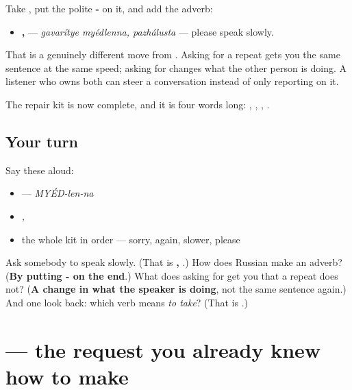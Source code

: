 \begin{grammarlens}[title={Grammar lens — the second repair move}]
Take \textbf{}, put the polite \textbf{-} on it, and add the adverb:

\begin{itemize}
\raggedright
  \item \textbf{ , } — \emph{gavarítye myédlenna, pazhálusta} — please speak slowly.
\end{itemize}

That is a genuinely different move from \textbf{}. Asking for a repeat gets you the same sentence at the same speed; asking for \textbf{} changes what the other person is doing. A listener who owns both can steer a conversation instead of only reporting on it.

The repair kit is now complete, and it is four words long: \textbf{}, \textbf{}, \textbf{ }, \textbf{}.
\end{grammarlens}

\subsection*{Your turn}
Say these aloud:

\begin{itemize}
\raggedright
  \item \emph{} — \emph{MYÉD-len-na}
  \item \emph{ , }
  \item the whole kit in order — sorry, again, slower, please
\end{itemize}

\begin{tcolorbox}[breakable,colback=teal!4,colframe=teal!35!black,title={Before you move on}]
Ask somebody to speak slowly. (That is \textbf{ , }.) How does Russian make an adverb? (\textbf{By putting - on the end}.) What does asking for \textbf{} get you that a repeat does not? (\textbf{A change in what the speaker is doing}, not the same sentence again.) And one look back: which verb means \emph{to take}? (That is \textbf{}.)
\end{tcolorbox}
\section[\texorpdfstring{\ru{помогите} (pamagítye)}{помогите (pamagítye)}]{ — the request you already knew how to make}

